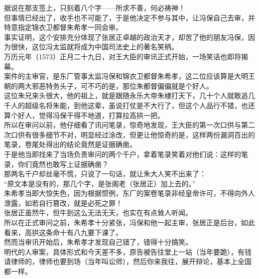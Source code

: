 \begin{multicols}{\theparacolNo}
据说在那支签上，只刻着八个字——所求不善，何必祷神！\\

但事情已经出了，收手也不可能了，于是他决定不参与其中，让冯保自己去审，并特意指定锦衣卫都督朱希孝一同会审。\\

事实证明，这个安排充分体现了张居正卓越的政治天才，却苦了他的朋友冯保，因为很快，这位冯太监就将成为中国司法史上的著名笑柄。\\

万历元年（1573）正月二十九日，对王大臣的审讯正式开始，一场笑话也即将揭幕。\\

案件的主审官，是东厂管事太监冯保和锦衣卫都督朱希孝，这二位应该算是大明王朝的两大邪恶特务头子，可不巧的是，那位朱都督偏偏就是个好人。\\

这位朱兄来头很大，他的祖上，就是跟随永乐大帝朱棣打天下，几十个人就敢追几千人的超级名将朱能，到他这辈，虽说打仗是不大行了，但这个人品行不错，也还算个好人，觉得冯保干得不地道，打算拉高拱一把。\\

所以在审问以前，他仔细看了讯问笔录，惊奇地发现，王大臣的第一次口供与第二次口供有很多细节不对，明显经过涂改，但更让他惊奇的是，这样两份漏洞百出的笔录，卷尾处得出的结论竟然是证据确凿。\\

于是他当即找来了当场负责审问的两个千户，拿着笔录笑着对他们说：这样的笔录，你们竟然也敢写上证据确凿？\\

那两名千户却丝毫不慌，只说了一句话，就让朱大人笑不出来了：\\

“原文本是没有的，那几个字，是张阁老（张居正）加上去的。”\\

朱希孝当即大惊失色，因为根据惯例，东厂的案卷笔录非经皇帝许可，不得向外人泄露，如若自行篡改，就是必死之罪！\\

张居正虽然牛，但牛到这么无法无天，也实在有点耸人听闻。\\

所以在正式审问之前，朱希孝十分紧张，冯保和他一起主审，张居正是后台，如此看来，高拱这条命十有八九要下课了。\\

然而当审讯开始后，朱希孝才发现自己错了，错得十分搞笑。\\

明代的人审案，具体形式和今天差不多，原告被告往堂上一站（当年要跪），有钱请律师的，律师也要到场（当年叫讼师），然后你来我往，展开辩论，基本上全国都一样。\\


\end{multicols}
